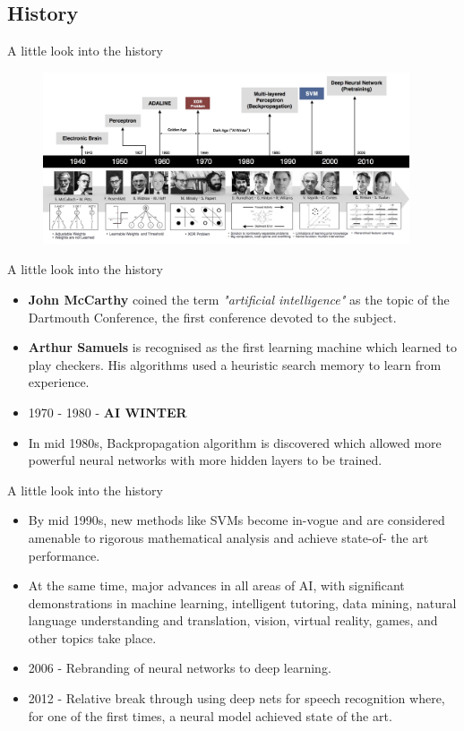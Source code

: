 \documentclass[10pt]{beamer}
\begin{document}
	\subsection{History}
	\begin{frame}{A little look into the history}
		\begin{figure}
			\includegraphics[width=\linewidth,height=2in]{images/history}
		\end{figure}
	\end{frame}
	\begin{frame}{A little look into the history}
		\begin{itemize} 
			\item \textbf{John McCarthy} coined the term \textit{"artificial intelligence"} as the topic of the Dartmouth Conference, the first conference devoted to the subject.
			\item \textbf{Arthur Samuels} is recognised as the first learning machine which learned to play checkers. His algorithms used a heuristic search memory to learn from experience.
			\item 1970 - 1980 - \textbf{AI WINTER}
			\item In mid 1980s, Backpropagation algorithm is discovered which allowed more powerful neural
			networks with more hidden layers to be trained.
		\end{itemize}
	\end{frame}
	\begin{frame}{A little look into the history}
		\begin{itemize}
			\item By mid 1990s, new methods like SVMs become in-vogue and are considered amenable to
			rigorous mathematical analysis and achieve state-of- the art performance.
			\item At the same time, major advances in all areas of AI, with significant demonstrations in machine learning, intelligent tutoring, data mining, natural language understanding and translation, vision, virtual reality, games, and other topics take place.
			\item 2006 - Rebranding of neural networks to deep learning.
			\item 2012 - Relative break through using deep nets for speech recognition where, for one of the first times, a neural model achieved state of the art.
		\end{itemize}
	\end{frame}
\end{document}
